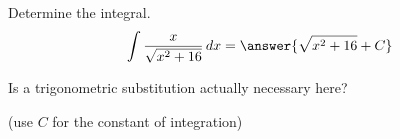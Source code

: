\documentclass{ximera}
\author{Jason Miller}
\begin{document}
\begin{exercise}
Determine the integral.
\[
\int \frac{x}{\sqrt{x^{2}+16}} \d x=\answer{ \sqrt{x^{2}+16} + C }
\]
\begin{feedback}
Is a trigonometric substitution actually necessary here?
\end{feedback}
(use $C$ for the constant of integration)


\end{exercise}
\end{document}
